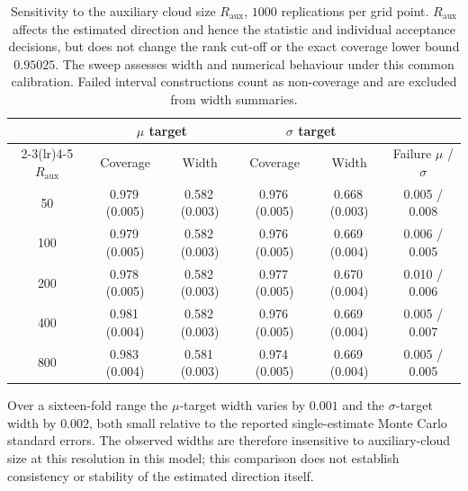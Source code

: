 \begin{table}[!htbp]
\centering
\caption{Sensitivity to the auxiliary cloud size $R_{\mathrm{aux}}$,
$1000$ replications per grid point. $R_{\mathrm{aux}}$ affects the estimated
direction and hence the statistic and individual acceptance decisions, but
does not change the rank cut-off or the exact coverage lower bound
$0.95025$. The sweep assesses width and numerical behaviour under this
common calibration. Failed interval constructions count as non-coverage
and are excluded from width summaries.}
\label{tab:sens-raux}
\small
\begin{tabular}{cccccc}
\toprule
& \multicolumn{2}{c}{$\mu$ target} & \multicolumn{2}{c}{$\sigma$ target} & \\
\cmidrule(lr){2-3}\cmidrule(lr){4-5}
$R_{\mathrm{aux}}$ & Coverage & Width & Coverage & Width & Failure $\mu$ / $\sigma$ \\
\midrule
50 & 0.979\,(0.005) & 0.582\,(0.003) & 0.976\,(0.005) & 0.668\,(0.003) & 0.005 / 0.008 \\
100 & 0.979\,(0.005) & 0.582\,(0.003) & 0.976\,(0.005) & 0.669\,(0.004) & 0.006 / 0.005 \\
200 & 0.978\,(0.005) & 0.582\,(0.003) & 0.977\,(0.005) & 0.670\,(0.004) & 0.010 / 0.006 \\
400 & 0.981\,(0.004) & 0.582\,(0.003) & 0.976\,(0.005) & 0.669\,(0.004) & 0.005 / 0.007 \\
800 & 0.983\,(0.004) & 0.581\,(0.003) & 0.974\,(0.005) & 0.669\,(0.004) & 0.005 / 0.005 \\
\bottomrule
\end{tabular}

\vspace{2pt}
\begin{minipage}{.94\linewidth}\footnotesize
Over a sixteen-fold range the $\mu$-target width varies by $0.001$ and the
$\sigma$-target width by $0.002$, both small relative to the reported
single-estimate Monte Carlo standard errors. The observed widths are
therefore insensitive to auxiliary-cloud size at this resolution in this
model; this comparison does not establish consistency or stability of
the estimated direction itself.
\end{minipage}
\end{table}

